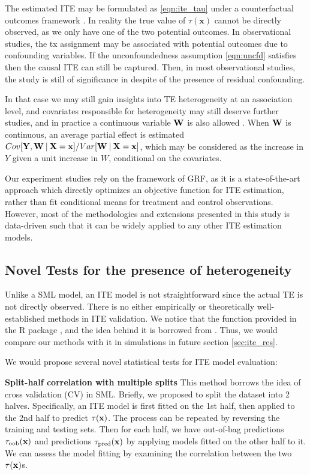   The estimated ITE may be formulated as \ref{eqn:ite_tau} under a counterfactual outcomes framework \cite{rubin2005causal}. In reality the true value of $\tau(\mathbf{x})$ cannot be directly observed, as we only have one of the two potential outcomes. In observational studies, the tx assignment may be associated with potential outcomes due to confounding variables. If the unconfoundedness assumption \ref{eqn:uncfd} satisfies then the causal ITE can still be captured. Then, in most observational studies, the study is still of significance in despite of the presence of residual confounding. 
  
  In that case we may still gain insights into TE heterogeneity at an association level, and covariates responsible for heterogeneity may still deserve further studies, and in practice a continuous variable $\mathbf{W}$ is also allowed \cite{athey2019generalized}. When $\mathbf{W}$ is continuous, an average partial effect is estimated $Cov [\mathbf{Y},\mathbf{W} \:\vert\: \mathbf{X} = \mathbf{x}] / Var[\mathbf{W} \:\vert\: \mathbf{X} = \mathbf{x}]$, which may be considered as the increase in $Y$ given a unit increase in $W$, conditional on the covariates. 
  
  Our experiment studies rely on the framework of GRF, as it is a state-of-the-art approach which directly optimizes an objective function for ITE estimation, rather than fit conditional means for treatment and control observations. However, most of the methodologies and extensions presented in this study is data-driven such that it can be widely applied to any other ITE estimation models. 

  \subsection{Novel Tests for the presence of heterogeneity}
  \label{sec:ite_novel_tests}
    Unlike a SML model, an ITE model is not straightforward since the actual TE is not directly observed. There is no either empirically or theoretically well-established methods in ITE validation. 
    We notice that the function  provided in the R package  \cite{tibshirani2018package}, and the idea behind it is borrowed from \cite{chernozhukov2018generic}. Thus,  we would compare our methods with it in simulations in future section \ref{sec:ite_res}.
    
    We would propose several novel statistical tests for ITE model evaluation:

    \textbf{Split-half correlation with multiple splits}  This method borrows the idea of cross validation (CV) in SML. Briefly, we proposed to split the dataset into 2 halves. Specifically, an ITE model is first fitted on the 1st half, then applied to the 2nd half to predict $\tau(\mathbf{x})$. The process can be repeated by reversing the training and testing sets. Then for each half, we have out-of-bag predictions $\tau_\mathrm{oob}(\mathbf{x})$ and predictions $\tau_\mathrm{pred}(\mathbf{x})$ by applying models fitted on the other half to it. We can assess the model fitting by examining the correlation between the two $\tau(\mathbf{x})$s.

